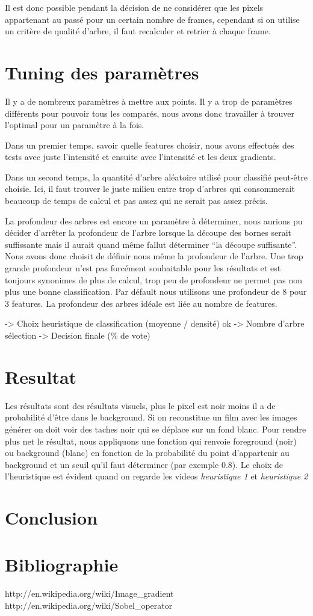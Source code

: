 \documentclass[11pt,a4paper]{report}
\begin{document}
			Il est donc possible pendant la décision de ne considérer que les pixels appartenant au passé pour un certain nombre de 
			frames, cependant si on utilise un critère de qualité d'arbre, il faut recalculer et retrier à chaque frame.

\section{Tuning des paramètres}
Il y a de nombreux paramètres à mettre aux points. Il y a trop de paramètres différents pour pouvoir tous les comparés, nous avons donc travailler à trouver l'optimal pour un paramètre à la fois. 

Dans un premier temps, savoir quelle features choisir, nous avons effectués des tests avec juste l'intensité et ensuite avec l'intensité et les deux gradients. 


Dans un second temps, la quantité d'arbre aléatoire utilisé pour classifié peut-être choisie. Ici, il faut trouver le juste milieu entre trop d'arbres qui consommerait beaucoup de temps de calcul et pas assez qui ne serait pas assez précis.

La profondeur des arbres est encore un paramètre à déterminer, nous aurions pu décider d'arrêter la profondeur de l'arbre lorsque la découpe des bornes serait suffissante mais il aurait quand même fallut déterminer ``la découpe suffisante''. Nous avons donc choisit de définir nous même la profondeur de l'arbre. Une trop grande profondeur n'est pas forcément souhaitable pour les résultats et est toujours synonimes de plus de calcul, trop peu de profondeur ne permet pas non plus une bonne classification. Par défault nous utilisons une profondeur de 8 pour 3 features. La profondeur des arbres idéale est liée au nombre de features.



-> Choix heuristique de classification (moyenne / densité)  ok 
-> Nombre d'arbre sélection
-> Decision finale (\% de vote)

\section{Resultat}
Les résultats sont des résultats visuels, plus le pixel est noir moins il a de probabilité d'être dans le background. Si on reconstitue un film avec les images générer on doit voir des taches noir qui se déplace sur un fond blanc. Pour rendre plus net le résultat, nous appliquons une fonction qui renvoie foreground (noir) ou background (blanc) en fonction de la probabilité du point d'appartenir au background et un seuil qu'il faut déterminer (par exemple 0.8). 
Le choix de l'heuristique est évident quand on regarde les videos \textit{heuristique 1} et \textit{heuristique 2}

\section{Conclusion}

	
	
\section{Bibliographie}	
\begin{thebibliography}{2}
    http://en.wikipedia.org/wiki/Image\_gradient
    http://en.wikipedia.org/wiki/Sobel\_operator
  
\end{thebibliography}
\end{document}

